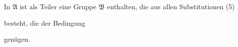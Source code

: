 In $\mathfrak{A}$ ist als Teiler eine Gruppe $\mathfrak{B}$ enthalten, die aus allen Substitutionen (5) %


besteht, die der Bedingung


genügen.
